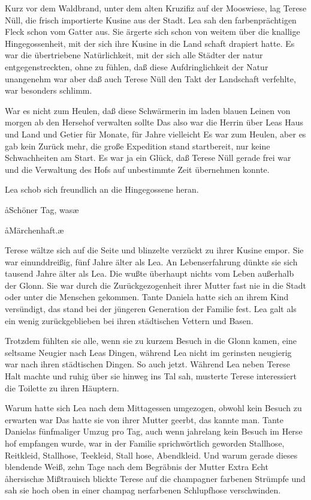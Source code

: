 Kurz vor dem Waldbrand, unter dem alten Kruzifiz auf der
Mooswiese, lag Terese Nüll, die frisch importierte Kusine
aus der Stadt. Lea sah den farbenprächtigen Fleck schon vom
Gatter aus. Sie ärgerte sich schon von weitem über die
knallige Hingegossenheit, mit der sich ihre Kusine in die Land\-%
schaft drapiert hatte. Es war die übertriebene Natürlichkeit,
mit der sich alle Städter der natur entgegenstreckten, ohne zu
fühlen, daß diese Aufdringlichkeit der Natur unangenehm
war\dopp{} aber daß auch Terese Nüll den Takt der Landschaft
verfehlte, war besonders schlimm.

War es nicht zum Heulen, daß diese Schwärmerin im laden\-%
blauen Leinen von morgen ab den Hersehof verwalten sollte\frag{}
Das also war die Herrin über Leas Haus und Land und
Getier für Monate, für Jahre vielleicht\frag{} Es war zum Heulen,
aber es gab kein Zurück mehr, die große Expedition stand
startbereit, nur keine Schwachheiten am Start. Es war ja
ein Glück, daß Terese Nüll gerade frei war und die Verwaltung
des Hofs auf unbestimmte Zeit übernehmen konnte.

Lea schob sich freundlich an die Hingegossene heran.

\aa Schöner Tag, was\frag{}\ae

\aa Märchenhaft.\ae

Terese wältze sich auf die Seite und blinzelte verzückt zu ihrer
Kusine empor. Sie war einunddreißig, fünf Jahre älter als
Lea. An Lebenserfahrung dünkte sie sich tausend Jahre älter
als Lea. Die wußte überhaupt nichts vom Leben außerhalb
der Glonn. Sie war durch die Zurückgezogenheit ihrer Mutter
fast nie in die Stadt oder unter die Menschen gekommen. Tante
Daniela hatte sich an ihrem Kind versündigt, das stand bei
der jüngeren Generation der Familie fest. Lea galt als ein
wenig zurückgeblieben bei ihren städtischen Vettern und Basen.

Trotzdem fühlten sie alle, wenn sie zu kurzem Besuch in die
Glonn kamen, eine seltsame Neugier nach Leas Dingen,
während Lea nicht im gerinsten neugierig war nach ihren
städtischen Dingen. So auch jetzt. Während Lea neben Terese
Halt machte und ruhig über sie hinweg ins Tal sah, musterte
Terese interessiert die Toilette zu ihren Häuptern.

Warum hatte sich Lea nach dem Mittagessen umgezogen,
obwohl kein Besuch zu erwarten war\frag{} Das hatte sie von ihrer
Mutter geerbt, das kannte man. Tante Danielas fünfmaliger
Umzug pro Tag, auch wenn jahrelang kein Besuch im Herse\-%
hof empfangen wurde, war in der Familie sprichwörtlich
geworden\dopp{} Stallhose, Reitkleid, Stallhose, Teekleid, Stall\-%
hose, Abendkleid. Und warum gerade dieses blendende Weiß,
zehn Tage nach dem Begräbnis der Mutter\frag{} Extra\frag{} Echt
\aa hersisch\ae\ausr{} Mißtrauisch blickte Terese auf die champagner\-%
farbenen Strümpfe und sah sie hoch oben in einer champag\-%
nerfarbenen Schlupfhose verschwinden.

